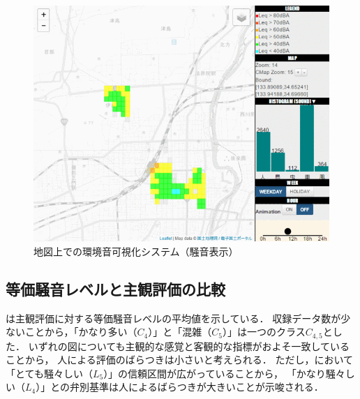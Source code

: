 \documentclass[autodetect-engine,dvi=dvipdfmx,ja=standard,
               a4,twoside,10pt]{bxjsarticle}
\begin{document}
\begin{figure}[tb]
\centering
	\includegraphics[width=.75\columnwidth]{img/soundmap_screenshot_rev150121_s.png}
	\caption{地図上での環境音可視化システム（騒音表示）}
	\label{fig:soundmap_loudness_screenshot}
\end{figure}


\subsection{等価騒音レベルと主観評価の比較}

は主観評価に対する等価騒音レベルの平均値を示している．
収録データ数が少ないことから，「かなり多い（$C_4$）」と「混雑（$C_5$）」は一つのクラス$C_{4,5}$とした．
いずれの図についても主観的な感覚と客観的な指標がおよそ一致していることから，
人による評価のばらつきは小さいと考えられる．
ただし，において「とても騒々しい（$L_5$）」の信頼区間が広がっていることから，
「かなり騒々しい（$L_4$）」との弁別基準は人によるばらつきが大きいことが示唆される．
\end{document}
